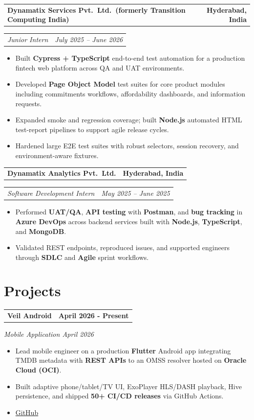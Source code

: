 \documentclass[11pt,a4paper]{article}
\makeatletter
\newcommand{\resumeHeader}[2]{%
  \noindent
  \begin{tabular*}{\textwidth}{@{}l@{\extracolsep{\fill}}r@{}}
    \textbf{#1} & \textbf{#2} \\
  \end{tabular*}%
}
\newcommand{\resumeSubheader}[2]{%
  \noindent
  \begin{tabular*}{\textwidth}{@{}l@{\extracolsep{\fill}}r@{}}
    \textit{#1} & \textit{#2} \\
  \end{tabular*}\vspace{2pt}%
}
\newcommand{\resumeProjectTitle}[2]{%
  \vspace{4pt}
  \noindent
  \begin{tabular*}{\textwidth}{@{}l@{\extracolsep{\fill}}r@{}}
    \textbf{#1} & \textbf{#2} \\
  \end{tabular*}%
}
\newcommand{\resumeProjectSubtitle}[1]{%
  \noindent\textit{#1}\vspace{2pt}%
}
\makeatother
\begin{document}
\resumeHeader{Dynamatix Services Pvt.\ Ltd.\ (formerly Transition Computing India)}{Hyderabad, India}
\resumeSubheader{Junior Intern}{July 2025 -- June 2026}
\begin{itemize}
  \item Built \textbf{Cypress + TypeScript} end-to-end test automation for a production fintech web platform across QA and UAT environments.
  \item Developed \textbf{Page Object Model} test suites for core product modules including commitments workflows, affordability dashboards, and information requests.
  \item Expanded smoke and regression coverage; built \textbf{Node.js} automated HTML test-report pipelines to support agile release cycles.
  \item Hardened large E2E test suites with robust selectors, session recovery, and environment-aware fixtures.
\end{itemize}

\resumeHeader{Dynamatix Analytics Pvt.\ Ltd.}{Hyderabad, India}
\resumeSubheader{Software Development Intern}{May 2025 -- June 2025}
\begin{itemize}
  \item Performed \textbf{UAT/QA}, \textbf{API testing} with \textbf{Postman}, and \textbf{bug tracking} in \textbf{Azure DevOps} across backend services built with \textbf{Node.js}, \textbf{TypeScript}, and \textbf{MongoDB}.
  \item Validated REST endpoints, reproduced issues, and supported engineers through \textbf{SDLC} and \textbf{Agile} sprint workflows.
\end{itemize}

\section{Projects}

\resumeProjectTitle{Veil Android}{April 2026 - Present}
\resumeProjectSubtitle{Mobile Application \textperiodcentered{} April 2026}
\begin{itemize}
  \item Lead mobile engineer on a production \textbf{Flutter} Android app integrating TMDB metadata with \textbf{REST APIs} to an OMSS resolver hosted on \textbf{Oracle Cloud (OCI)}.
  \item Built adaptive phone/tablet/TV UI, ExoPlayer HLS/DASH playback, Hive persistence, and shipped \textbf{50+ CI/CD releases} via GitHub Actions.
  \item \href{https://github.com/dikshadamahe/veil-android}{GitHub}
\end{itemize}
\end{document}
